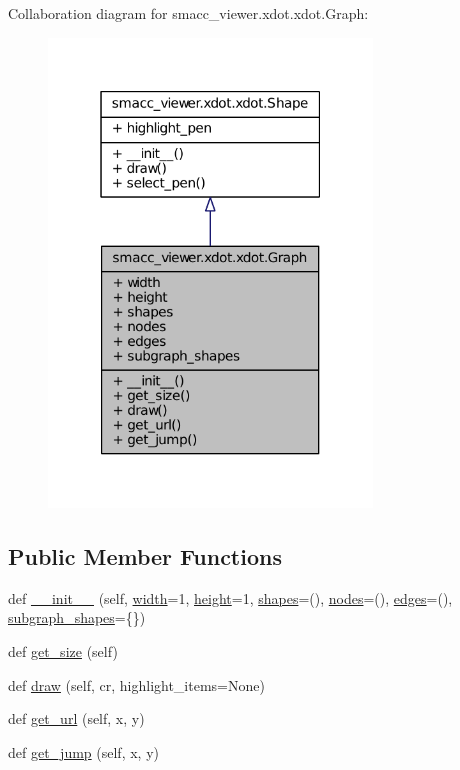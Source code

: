 Collaboration diagram for smacc\+\_\+viewer.\+xdot.\+xdot.\+Graph\+:
\nopagebreak
\begin{figure}[H]
\begin{center}
\leavevmode
\includegraphics[width=244pt]{classsmacc__viewer_1_1xdot_1_1xdot_1_1Graph__coll__graph}
\end{center}
\end{figure}
\subsection*{Public Member Functions}
\begin{DoxyCompactItemize}
\item 
def \hyperlink{classsmacc__viewer_1_1xdot_1_1xdot_1_1Graph_a5d2184bfef48c94a9fa215b66f892b30}{\+\_\+\+\_\+init\+\_\+\+\_\+} (self, \hyperlink{classsmacc__viewer_1_1xdot_1_1xdot_1_1Graph_a85c4c590b6e678fa36f5765a7a55f070}{width}=1, \hyperlink{classsmacc__viewer_1_1xdot_1_1xdot_1_1Graph_a6cb6db75d4f5a5696f69f34c6b500f34}{height}=1, \hyperlink{classsmacc__viewer_1_1xdot_1_1xdot_1_1Graph_a6f354c47ee7839b3a7609e42c66165c5}{shapes}=(), \hyperlink{classsmacc__viewer_1_1xdot_1_1xdot_1_1Graph_afcc48b27e46e8e0ddd98a35d5de99d16}{nodes}=(), \hyperlink{classsmacc__viewer_1_1xdot_1_1xdot_1_1Graph_af2a8b69040a55cf35b72d94790d1f323}{edges}=(), \hyperlink{classsmacc__viewer_1_1xdot_1_1xdot_1_1Graph_adad612ffb824b1f04e480ac8b97f5e2f}{subgraph\+\_\+shapes}=\{\})
\item 
def \hyperlink{classsmacc__viewer_1_1xdot_1_1xdot_1_1Graph_a38fed7f53df007216a2080c7e3d04364}{get\+\_\+size} (self)
\item 
def \hyperlink{classsmacc__viewer_1_1xdot_1_1xdot_1_1Graph_a5ce24428865ae2fc895b91a3de97f920}{draw} (self, cr, highlight\+\_\+items=None)
\item 
def \hyperlink{classsmacc__viewer_1_1xdot_1_1xdot_1_1Graph_adb1cd887622d6e38a2549a5d0941dd7e}{get\+\_\+url} (self, x, y)
\item 
def \hyperlink{classsmacc__viewer_1_1xdot_1_1xdot_1_1Graph_a3f64d09b9077e7da20432de1f3b25b5f}{get\+\_\+jump} (self, x, y)
\end{DoxyCompactItemize}
